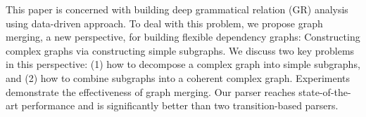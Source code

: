 This paper is concerned with building deep grammatical relation (GR) analysis using data-driven approach. To deal with this problem, we propose graph merging, a new perspective, for building flexible dependency graphs: Constructing complex graphs via constructing simple subgraphs. We discuss two key problems in this perspective: (1) how to decompose a complex graph into simple subgraphs, and (2) how to combine subgraphs into a coherent complex graph. Experiments demonstrate the effectiveness of graph merging. Our parser reaches state-of-the-art performance and is significantly better than two transition-based parsers.
